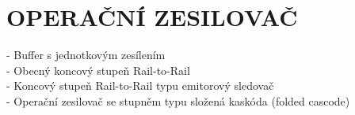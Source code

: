 \section{OPERAČNÍ ZESILOVAČ}
- Buffer s jednotkovým zesílením\\
- Obecný koncový stupeň Rail-to-Rail\\
- Koncový stupeň Rail-to-Rail typu emitorový sledovač\\
- Operační zesilovač se stupněm typu složená kaskóda (folded cascode)\\